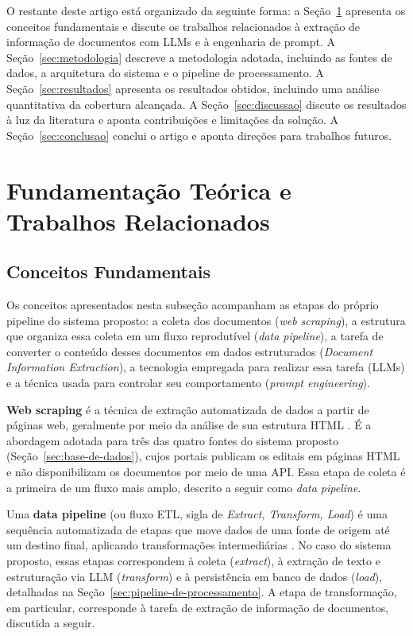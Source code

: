 \documentclass[12pt]{article}
\begin{document}
  O restante deste artigo está organizado da seguinte forma: a Seção~\ref{sec:fundamentacao-teorica-e-trabalhos-relacionados} apresenta os conceitos fundamentais e discute os trabalhos relacionados à extração de informação de documentos com LLMs e à engenharia de prompt. A Seção~\ref{sec:metodologia} descreve a metodologia adotada, incluindo as fontes de dados, a arquitetura do sistema e o pipeline de processamento. A Seção~\ref{sec:resultados} apresenta os resultados obtidos, incluindo uma análise quantitativa da cobertura alcançada. A Seção~\ref{sec:discussao} discute os resultados à luz da literatura e aponta contribuições e limitações da solução. A Seção~\ref{sec:conclusao} conclui o artigo e aponta direções para trabalhos futuros.

  \section{Fundamentação Teórica e Trabalhos Relacionados}\label{sec:fundamentacao-teorica-e-trabalhos-relacionados}

  \subsection{Conceitos Fundamentais}\label{sec:conceitos-fundamentais}
  Os conceitos apresentados nesta subseção acompanham as etapas do próprio pipeline do sistema proposto: a coleta dos documentos (\emph{web scraping}), a estrutura que organiza essa coleta em um fluxo reprodutível (\emph{data pipeline}), a tarefa de converter o conteúdo desses documentos em dados estruturados (\emph{Document Information Extraction}), a tecnologia empregada para realizar essa tarefa (LLMs) e a técnica usada para controlar seu comportamento (\emph{prompt engineering}).

  \textbf{Web scraping} é a técnica de extração automatizada de dados a partir de páginas web, geralmente por meio da análise de sua estrutura HTML \cite{b1}. É a abordagem adotada para três das quatro fontes do sistema proposto (Seção~\ref{sec:base-de-dados}), cujos portais publicam os editais em páginas HTML e não disponibilizam os documentos por meio de uma API. Essa etapa de coleta é a primeira de um fluxo mais amplo, descrito a seguir como \emph{data pipeline}.

  Uma \textbf{data pipeline} (ou fluxo ETL, sigla de \emph{Extract, Transform, Load}) é uma sequência automatizada de etapas que move dados de uma fonte de origem até um destino final, aplicando transformações intermediárias \cite{b3}. No caso do sistema proposto, essas etapas correspondem à coleta (\emph{extract}), à extração de texto e estruturação via LLM (\emph{transform}) e à persistência em banco de dados (\emph{load}), detalhadas na Seção~\ref{sec:pipeline-de-processamento}. A etapa de transformação, em particular, corresponde à tarefa de extração de informação de documentos, discutida a seguir.
\end{document}
